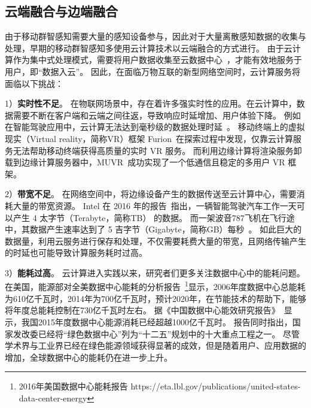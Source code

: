 \subsection{云端融合与边端融合}

由于移动群智感知需要大量的感知设备参与，因此对于大量离散感知数据的收集与处理，早期的移动群智感知多使用云计算技术以云端融合的方式进行。
由于云计算作为集中式处理模式，需要将用户数据收集至云数据中心~\cite{DBLP:conf/icdcs/Montresor16}，才能有效地服务于用户，即“数据入云”。
因此，在面临万物互联的新型网络空间时，云计算服务将面临以下挑战：


1）\textbf{实时性不足}。
在物联网场景中，存在着许多强实时性的应用。在云计算中，数据需要不断在客户端和云端之间往返，导致响应时延增加、用户体验下降。
例如在智能驾驶应用中，云计算无法达到毫秒级的数据处理时延~\cite{DBLP:conf/cvpr/GeigerLU12}。
移动终端上的虚拟现实（Virtual reality，简称VR）框架 Furion~\cite{DBLP:conf/mobicom/LaiHCSD17}在探索过程中发现，仅靠云计算服务无法帮助移动终端获得高质量的实时 VR 服务。
而利用边缘计算将渲染服务卸载到边缘计算服务器中，MUVR~\cite{DBLP:conf/edge/LiG18}成功实现了一个低通信且稳定的多用户 VR 框架。

2）\textbf{带宽不足}。
在网络空间中，将边缘设备产生的数据传送至云计算中心，需要消耗大量的带宽资源。
Intel 在 2016 年的报告~\cite{DBLP:journals/micro/KatoTINTH15}指出，一辆智能驾驶汽车工作一天可以产生 4 太字节（Terabyte，简称TB） 的数据。
而一架波音787飞机在飞行途中，其数据产生速率达到了 5 吉字节（Gigabyte，简称GB）每秒~\cite{JCRD/shi17}。
如此巨大的数据量，利用云服务进行保存和处理，不仅需要耗费大量的带宽，且网络传输产生的时延也可能导致计算服务耗时过高。

3）\textbf{能耗过高}。
云计算进入实践以来，研究者们更多关注数据中心中的能耗问题。
在美国，能源部对全美数据中心能耗的分析报告~\footnote{2016年美国数据中心能耗报告 https://eta.lbl.gov/publications/united-states-data-center-energy}显示，2006年度数据中心总能耗为610亿千瓦时，2014年为700亿千瓦时，预计2020年，在节能技术的帮助下，能够将年度总能耗控制在730亿千瓦时左右。
据《中国数据中心能效研究报告》~\cite{whitebooks/cn15}显示，我国2015年度数据中心能源消耗已经超越1000亿千瓦时。
报告同时指出，国家发改委已经将“绿色数据中心”列为“十二五”规划中的十大重点工程之一。
尽管学术界与工业界已经在绿色能源领域获得显著的成效，但是随着用户、应用数据的增加，全球数据中心的能耗仍在进一步上升。



